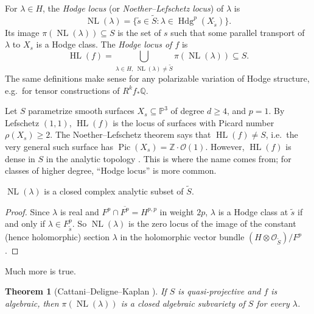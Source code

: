 \documentclass[12pt]{amsart}
\newcommand{\Q}{\mathbb{Q}}
\newcommand{\Z}{\mathbb{Z}}
\newcommand{\PP}{\mathbb{P}}
\DeclareMathOperator{\Hdg}{Hdg}
\DeclareMathOperator{\NL}{NL}
\DeclareMathOperator{\HL}{HL}
\DeclareMathOperator{\Pic}{Pic}
\newcommand{\cO}{\mathcal{O}}
\newcommand{\ol}{\overline}
\newcommand{\wt}{\widetilde}
\newtheorem{theorem}{Theorem}[section]
\theoremstyle{definition}
\theoremstyle{remark}
\numberwithin{equation}{section}
\begin{document}
\begin{definition}
    For $\lambda \in H$, the \emph{Hodge locus} (or \emph{Noether--Lefschetz
    locus}) of $\lambda$ is
    \begin{equation*}
        \NL(\lambda) = \{\tilde{s} \in \wt{S} : \lambda \in
        \Hdg^p(X_{\tilde{s}})\}.
    \end{equation*}
    Its image $\pi(\NL(\lambda)) \subseteq S$ is the set of $s$ such that some
    parallel transport of $\lambda$ to $X_s$ is a Hodge class. The \emph{Hodge
    locus of $f$} is
    \begin{equation*}
        \HL(f) = \bigcup_{\lambda \in H,\ \NL(\lambda) \neq \wt{S}}
        \pi(\NL(\lambda)) \subseteq S.
    \end{equation*}
    The same definitions make sense for any polarizable variation of Hodge
    structure, e.g.\ for tensor constructions of $R^k f_* \Q$.
\end{definition}

\begin{example}
    Let $S$ parametrize smooth surfaces $X_s \subseteq \PP^3$ of degree
    $d \geq 4$, and $p = 1$. By Lefschetz $(1,1)$, $\HL(f)$ is the locus of
    surfaces with Picard number $\rho(X_s) \geq 2$. The Noether--Lefschetz
    theorem says that $\HL(f) \neq S$, i.e.\ the very general such surface has
    $\Pic(X_s) = \Z \cdot \cO(1)$. However, $\HL(f)$ is dense in $S$ in the
    analytic topology \cite{CHM88}. This is where the name comes from; for
    classes of higher degree, ``Hodge locus'' is more common.
\end{example}

\begin{proposition}
    $\NL(\lambda)$ is a closed complex analytic subset of $\wt{S}$.
\end{proposition}
\begin{proof}
    Since $\lambda$ is real and $F^p \cap \ol{F^p} = H^{p,p}$ in weight $2p$,
    $\lambda$ is a Hodge class at $\tilde{s}$ if and only if
    $\lambda \in F^p_{\tilde{s}}$. So $\NL(\lambda)$ is the zero locus of the
    image of the constant (hence holomorphic) section $\lambda$ in the
    holomorphic vector bundle $(H \otimes \cO_{\wt{S}})/F^p$.
\end{proof}

Much more is true.

\begin{theorem}[Cattani--Deligne--Kaplan \cite{CDK95}]
    If $S$ is quasi-projective and $f$ is algebraic, then $\pi(\NL(\lambda))$
    is a closed algebraic subvariety of $S$ for every $\lambda$.
\end{theorem}
\end{document}
